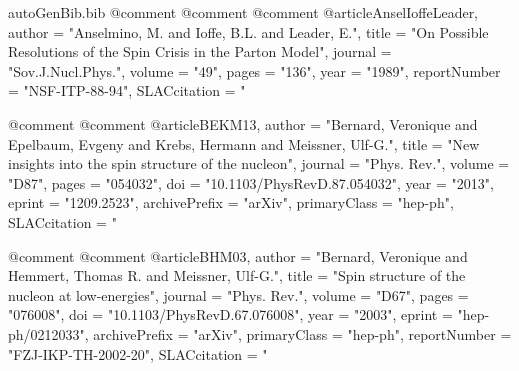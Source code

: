 \begin{filecontents*}{autoGenBib.bib}
@comment %
@comment %
@comment %
@article{AnselIoffeLeader,
      author         = "Anselmino, M. and Ioffe, B.L. and Leader, E.",
      title          = "{On Possible Resolutions of the Spin Crisis in the Parton Model}",
      journal        = "Sov.J.Nucl.Phys.",
      volume         = "49",
      pages          = "136",
      year           = "1989",
      reportNumber   = "NSF-ITP-88-94",
      SLACcitation   = "%
}

@comment %
@comment %
@article{BEKM13,
      author         = "Bernard, Veronique and Epelbaum, Evgeny and Krebs, Hermann and Meissner, Ulf-G.",
      title          = "{New insights into the spin structure of the nucleon}",
      journal        = "Phys. Rev.",
      volume         = "D87",
      pages          = "054032",
      doi            = "10.1103/PhysRevD.87.054032",
      year           = "2013",
      eprint         = "1209.2523",
      archivePrefix  = "arXiv",
      primaryClass   = "hep-ph",
      SLACcitation   = "%
}

@comment %
@comment %
@article{BHM03,
      author         = "Bernard, Veronique and Hemmert, Thomas R. and Meissner, Ulf-G.",
      title          = "{Spin structure of the nucleon at low-energies}",
      journal        = "Phys. Rev.",
      volume         = "D67",
      pages          = "076008",
      doi            = "10.1103/PhysRevD.67.076008",
      year           = "2003",
      eprint         = "hep-ph/0212033",
      archivePrefix  = "arXiv",
      primaryClass   = "hep-ph",
      reportNumber   = "FZJ-IKP-TH-2002-20",
      SLACcitation   = "%
}


\end{filecontents*}
